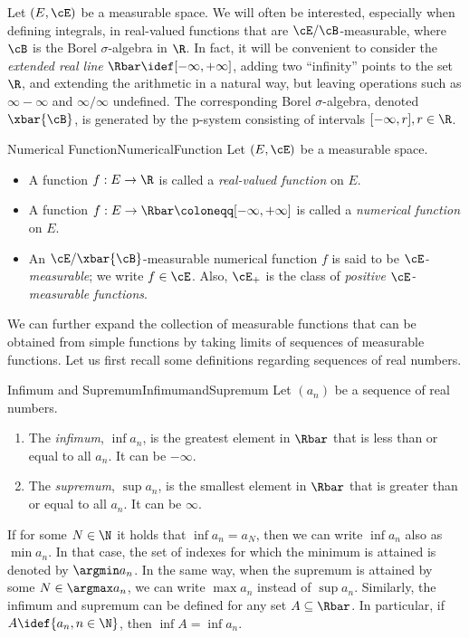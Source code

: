 Let $(E, \cE)$ be a measurable space. We will often be interested, especially when defining integrals, in real-valued functions that are $\cE/\cB$-measurable, where $\cB$ is the Borel $\sigma$-algebra in $\R$. In fact, it will be convenient to consider the \textit{extended real line} $\Rbar \idef [-\infty, +\infty]$, adding two ``infinity'' points to the set $\R$, and extending the arithmetic in a natural way, but leaving operations such as $\infty - \infty$ and $\infty/\infty$ undefined. The corresponding Borel $\sigma$-algebra, denoted $\xbar{\cB}$, is generated by the p-system consisting of intervals $[-\infty, r], r \in \R$.

\begin{defn}{Numerical Function}{NumericalFunction}
	Let $(E, \cE)$ be a measurable space.
	\begin{itemize}
		\item A function $f : E \to \R$ is called a \textit{real-valued function} on $E$.
		\item A function $f : E \to \Rbar \coloneqq [-\infty, +\infty]$ is called a \textit{numerical function} on $E$.
		\item An $\cE/\xbar{\cB}$-measurable numerical function $f$ is said to be \textit{$\cE$-measurable}; we write $f \in \cE$. Also, $\cE_+$ is the class of \textit{positive $\cE$-measurable functions}.
	\end{itemize}
\end{defn}

We can further expand the collection of measurable functions that can be obtained from simple functions by taking limits of sequences of measurable functions. Let us first recall some definitions regarding sequences of real numbers.

\begin{defn}{Infimum and Supremum}{InfimumandSupremum}
	Let $(a_n)$ be a sequence of real numbers.
	\begin{enumerate}
		\item The \textit{infimum}, $\inf a_n$, is the greatest element in $\Rbar$ that is less than or equal to all $a_n$. It can be $-\infty$.
		\item The \textit{supremum}, $\sup a_n$, is the smallest element in $\Rbar$ that is greater than or equal to all $a_n$. It can be $\infty$.
	\end{enumerate}
\end{defn}

If for some $N \in \N$ it holds that $\inf a_n = a_N$, then we can write $\inf a_n$ also as $\min a_n$. In that case, the set of indexes for which the minimum is attained is denoted by $\argmin a_n$. In the same way, when the supremum is attained by some $N \in \argmax a_n$, we can write $\max a_n$ instead of $\sup a_n$. Similarly, the infimum and supremum can be defined for any set $A \subseteq \Rbar$. In particular, if $A \idef \{a_n, n \in \N\}$, then $\inf A = \inf a_n$.

